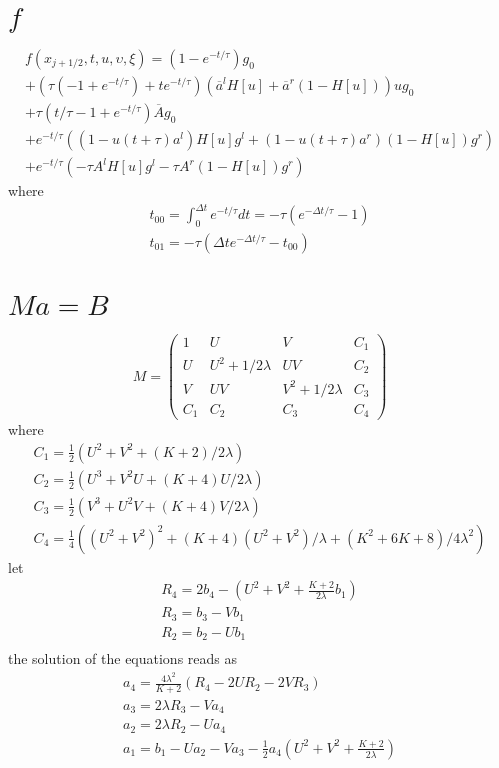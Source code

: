 \documentclass[review]{elsarticle}
\begin{document}
\section{$f$}
\begin{eqnarray}
	f\left(x_{j+1/2}, t, u, \upsilon, \xi \right) = \left(1 - e^{-t/\tau}\right)g_0 \nonumber \\
	+ \left(\tau\left(-1 + e^{-t/\tau}\right) + te^{-t/\tau}\right)
	\left(\overline{a}^lH[u] + \overline{a}^r(1-H[u]) \right)ug_0 \nonumber \\
	+ \tau\left(t/\tau - 1 + e^{-t/\tau}\right)\overline{A}g_0 \\
	+ e^{-t/\tau}\left(
	(1 - u(t + \tau)a^l)H[u]g^l + (1 - u(t + \tau)a^r)(1 - H[u])g^r   
	\right) \nonumber \\
	+ e^{-t/\tau}\left(
	-\tau A^lH[u]g^l - \tau A^r(1 - H[u])g^r 
	\right) \nonumber
\end{eqnarray}
where
\begin{eqnarray}
	t_{00} = \int_0^{\Delta{t}} e^{-t/\tau}dt = -\tau\left(e^{-\Delta{t}/\tau} - 1\right) \\
	t_{01} = -\tau\left(\Delta{t}e^{-\Delta{t}/\tau} - t_{00}\right)
\end{eqnarray}


\section{$Ma = B$}
\begin{equation}
	M = \left(\begin{array}{cccc} 
	1 & U & V & C_1 \\
	U & U^2 + 1/2\lambda & UV & C_2 \\
	V & UV & V^2 + 1/2\lambda & C_3 \\
	C_1 & C_2 & C_3 & C_4
\end{array}
\right)
\end{equation}
where
\begin{eqnarray}
	C_1 = \frac{1}{2}\left(
	U^2 + V^2 + (K + 2)/2\lambda 
	\right)\\
	C_2 = \frac{1}{2}\left(
	U^3 + V^2U + (K + 4)U/2\lambda 
	\right)\\   
	C_3 = \frac{1}{2}\left(
	V^3 + U^2V + (K + 4)V/2\lambda 
	\right)\\  
	C_4 = \frac{1}{4}\left(
	(U^2 + V^2)^2 + (K + 4)(U^2 + V^2)/\lambda + (K^2 + 6K + 8)/4\lambda^2 
	\right)
\end{eqnarray}
let 
\begin{eqnarray}
	R_4 = 2b_4 - \left(
	U^2 + V^2 + \frac{K + 2}{2\lambda}b_1 
	\right) \\
	R_3 = b_3 - Vb_1 \\
	R_2 = b_2 - Ub_1 \\
\end{eqnarray}
the solution of the equations reads as 
\begin{eqnarray}
	a_4 = \frac{4\lambda^2}{K + 2}\left(R_4 - 2UR_2 - 2VR_3\right) \\
	a_3 = 2\lambda{R_3} - Va_4 \\
	a_2 = 2\lambda{R_2} - Ua_4 \\
	a_1 = b_1 - Ua_2 - Va_3 - \frac{1}{2}a_4\left(U^2 + V^2 + \frac{K + 2}{2\lambda}\right)  
\end{eqnarray}
\end{document}
